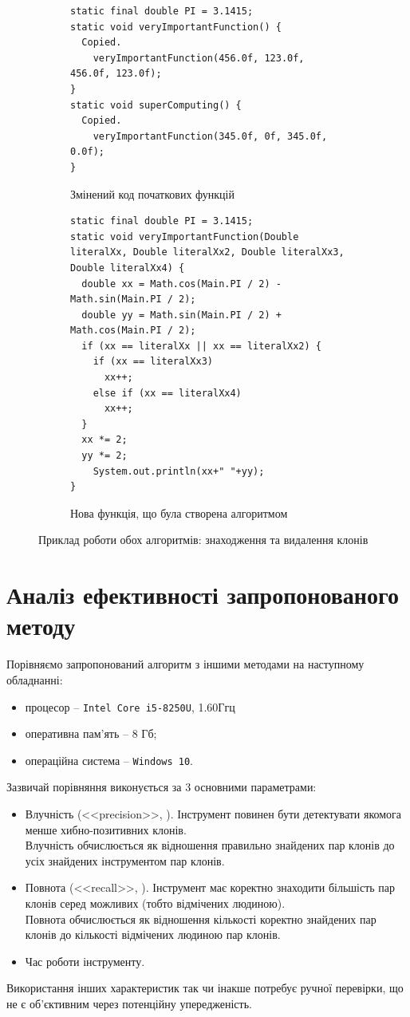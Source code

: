 \documentclass[a4paper, 14pt]{article}
\begin{document}
\begin{figure}[h!]
\centering
\begin{subfigure}[t]{0.4\textwidth}
\begin{lstlisting}[frame=none]
static final double PI = 3.1415;
static void veryImportantFunction() {
  Copied.
    veryImportantFunction(456.0f, 123.0f, 456.0f, 123.0f);
}
static void superComputing() {
  Copied.
    veryImportantFunction(345.0f, 0f, 345.0f, 0.0f);
}
\end{lstlisting}
\caption{Змінений код початкових функцій}
\end{subfigure}
\begin{subfigure}[t]{0.5\textwidth}
\begin{lstlisting}[frame=none]
static final double PI = 3.1415;
static void veryImportantFunction(Double literalXx, Double literalXx2, Double literalXx3, Double literalXx4) {
  double xx = Math.cos(Main.PI / 2) - Math.sin(Main.PI / 2);
  double yy = Math.sin(Main.PI / 2) + Math.cos(Main.PI / 2);
  if (xx == literalXx || xx == literalXx2) {
    if (xx == literalXx3)
      xx++;
    else if (xx == literalXx4)
      xx++;
  }
  xx *= 2;
  yy *= 2;
	System.out.println(xx+" "+yy);
}
\end{lstlisting}
\caption{Нова функція, що була створена алгоритмом}
\end{subfigure}
\caption{Приклад роботи обох алгоритмів: знаходження та видалення клонів}
\end{figure} 
\section{Аналіз ефективності запропонованого методу}
Порівняємо запропонований алгоритм з іншими методами на наступному обладнанні:
\begin{itemize}
\item процесор -- \verb|Intel Core i5-8250U|, 1.60Ггц
\item оперативна пам'ять -- 8 Гб;
\item операційна система -- \verb|Windows 10|.
\end{itemize} 
Зазвичай порівняння виконується за 3 основними параметрами: 
\begin{itemize}
\item Влучність (<<precision>>, \cite{wiki:precisionrecall}). Інструмент повинен бути детектувати якомога менше хибно-позитивних клонів. \\ Влучність обчислюється як відношення правильно знайдених пар клонів до усіх знайдених інструментом пар клонів.
\item Повнота (<<recall>>, \cite{wiki:precisionrecall}). Інструмент має коректно знаходити більшість пар клонів серед можливих (тобто відмічених людиною). \\ Повнота обчислюється як відношення кількості коректно знайдених пар клонів до кількості відмічених людиною пар клонів.
\item Час роботи інструменту.
\end{itemize}
Використання інших характеристик так чи інакше потребує ручної перевірки, що не є об'єктивним через потенційну упередженість.
\end{document}
